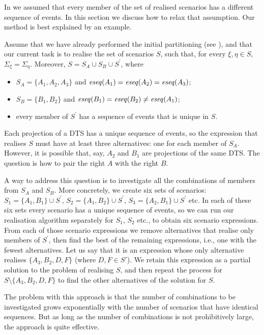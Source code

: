 In  we assumed that every member of the set of
realised scenarios has a different sequence of events. In this section
we discuss how to relax that assumption. Our method is best explained
by an example.

Assume that we have already performed the initial partitioning
(see ), and that
our current task is to realise the set of scenarios $S$, such
that, for every $\xi, \eta \in S$, $\Sigma_{\xi} = \Sigma_{\eta}$.
Moreover, $S = S_A \cup S_B \cup S^{\prime}$, where
\begin{itemize}
  \item
    $S_A = \{A_1, A_2, A_3\}$ and $\mathit{eseq}(A_1) = \mathit{eseq}(A_2) = \mathit{eseq}(A_3)$;
  \item
    $S_B = \{B_1, B_2\}$ and $\mathit{eseq}(B_1) = \mathit{eseq}(B_2) \neq \mathit{eseq}(A_1)$;
  \item
    every member of $S^{\prime}$ has a sequence of events that is unique in $S$.
\end{itemize}

Each projection of a DTS has a unique sequence of events, so the expression that
realises $S$ must have at least three alternatives: one for each member of
$S_A$. However, it is possible that, say, $A_2$ and $B_1$ are projections of the
same DTS. The question is how to pair the right $A$ with the right $B$.

A way to address this question is to investigate all the combinations of members
from $S_A$ and $S_B$.
More concretely, we create six sets of scenarios:
$S_1 = \{A_1, B_1\} \cup S^{\prime}$,
$S_2 = \{A_1, B_2\} \cup S^{\prime}$,
$S_3 = \{A_2, B_1\} \cup S^{\prime}$ etc.
In each of these six sets every scenario has a unique sequence of events, so we
can run our realisation algorithm separately for $S_1$, $S_2$ etc., to obtain
six scenario expressions. From each of those scenario expressions we remove
alternatives that realise only members of $S^{\prime}$, then find the best of
the remaining expressions, i.e., one with the fewest alternatives. Let us say
that it is an expression whose only alternative realises
$\{A_3, B_2, D, F\}$ (where $D,F\in S'$).
We retain this expression as a partial solution to the problem of realising
$S$, and then repeat the process for $S \setminus \{A_3, B_2, D, F\}$
to find the other alternatives of the solution for $S$.

The problem with this approach is that the number of combinations to be
investigated grows exponentially with the number of scenarios that have
identical sequences. But as long as the number of combinations is not
prohibitively large,
the approach is quite effective.
